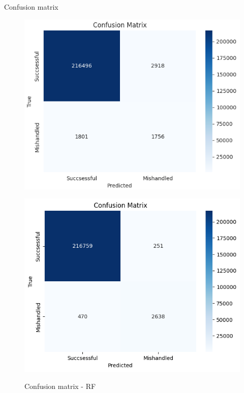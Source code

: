 \documentclass{beamer}
\begin{document}
\begin{frame}{Confusion matrix}
    \begin{figure}
    \begin{minipage}[c]{0.45\linewidth}
    \includegraphics[width=1\textwidth]{Confusion_matrix_Model 1.png}\\
    \caption{Confusion matrix - LR}
\end{minipage}
\hfill
\begin{minipage}[c]{0.45\linewidth}
    \includegraphics[width=1\textwidth]{Confusion_matrix_Model 6.png}\\
    \caption{Confusion matrix - RF}
\end{minipage}
\end{figure}
\end{frame}
\end{document}
